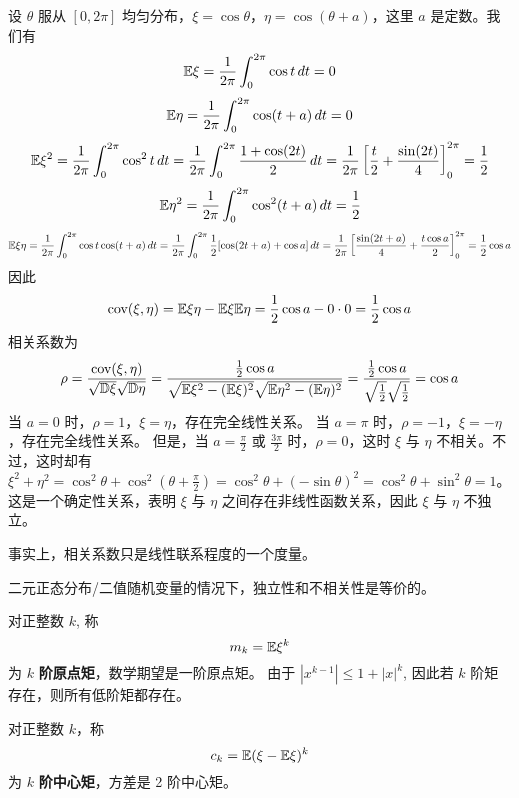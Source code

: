 \begin{example} \label{ex:uncorrelated_not_independent}
\newline 设 $\theta$ 服从 $[0,2\pi]$ 均匀分布，$\xi=\cos\theta$，$\eta=\cos(\theta+a)$，这里 $a$ 是定数。我们有
\[
\mathbb{E}\xi = \frac{1}{2\pi}\int_0^{2\pi} \cos t \,dt = 0
\]
\[
\mathbb{E}\eta = \frac{1}{2\pi}\int_0^{2\pi} \cos(t+a) \,dt = 0
\]
\[
\mathbb{E}\xi^2 = \frac{1}{2\pi}\int_0^{2\pi} \cos^2 t \,dt = \frac{1}{2\pi}\int_0^{2\pi} \frac{1+\cos(2t)}{2} \,dt = \frac{1}{2\pi}\left[\frac{t}{2}+\frac{\sin(2t)}{4}\right]_0^{2\pi} = \frac{1}{2}
\]
\[
\mathbb{E}\eta^2 = \frac{1}{2\pi}\int_0^{2\pi} \cos^2(t+a) \,dt = \frac{1}{2}
\]
\[
\mathbb{E}\xi\eta = \frac{1}{2\pi}\int_0^{2\pi} \cos t \cos(t+a) \,dt = \frac{1}{2\pi}\int_0^{2\pi} \frac{1}{2}[\cos(2t+a) + \cos a] \,dt = \frac{1}{2\pi}\left[\frac{\sin(2t+a)}{4} + \frac{t \cos a}{2}\right]_0^{2\pi} = \frac{1}{2}\cos a
\]
因此
\[
\text{cov}(\xi,\eta) = \mathbb{E}\xi\eta - \mathbb{E}\xi\mathbb{E}\eta = \frac{1}{2}\cos a - 0 \cdot 0 = \frac{1}{2}\cos a
\]
相关系数为
\[
\rho = \frac{\text{cov}(\xi,\eta)}{\sqrt{\mathbb{D}\xi}\sqrt{\mathbb{D}\eta}} = \frac{\frac{1}{2}\cos a}{\sqrt{\mathbb{E}\xi^2 - (\mathbb{E}\xi)^2}\sqrt{\mathbb{E}\eta^2 - (\mathbb{E}\eta)^2}} = \frac{\frac{1}{2}\cos a}{\sqrt{\frac{1}{2}}\sqrt{\frac{1}{2}}} = \cos a
\]
当 $a=0$ 时，$\rho=1$，$\xi=\eta$，存在完全线性关系。
当 $a=\pi$ 时，$\rho=-1$，$\xi=-\eta$，存在完全线性关系。
但是，当 $a=\frac{\pi}{2}$ 或 $\frac{3\pi}{2}$ 时，$\rho=0$，这时 $\xi$ 与 $\eta$ 不相关。不过，这时却有 $\xi^2+\eta^2=\cos^2\theta + \cos^2(\theta+\frac{\pi}{2}) = \cos^2\theta + (-\sin\theta)^2 = \cos^2\theta + \sin^2\theta = 1$。这是一个确定性关系，表明 $\xi$ 与 $\eta$ 之间存在非线性函数关系，因此 $\xi$ 与 $\eta$ 不独立。
\end{example}
\begin{remark}
    事实上，相关系数只是线性联系程度的一个度量。
\end{remark}
\begin{remark}
    二元正态分布/二值随机变量的情况下，独立性和不相关性是等价的。
\end{remark}
\begin{definition}[原点矩] \label{def:kth_raw_moment}
对正整数 $k$, 称
\begin{equation} \label{eq:kth_raw_moment}
m_k = \mathbb{E}\xi^k
\end{equation}
为 $k$ \textbf{阶原点矩}，数学期望是一阶原点矩。
由于 $|x^{k-1}|\le 1+|x|^k$, 因此若 $k$ 阶矩存在，则所有低阶矩都存在。
\end{definition}

\begin{definition}[中心矩] \label{def:kth_central_moment}
对正整数 $k$，称
\begin{equation} \label{eq:kth_central_moment}
c_k = \mathbb{E}(\xi - \mathbb{E}\xi)^k
\end{equation}
为 $k$ \textbf{阶中心矩}，方差是 2 阶中心矩。
\end{definition}


